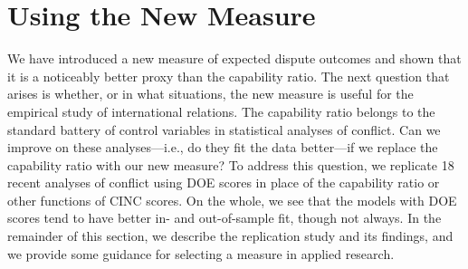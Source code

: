 \section{Using the New Measure}

We have introduced a new measure of expected dispute outcomes and shown that it is a noticeably better proxy than the capability ratio.
The next question that arises is whether, or in what situations, the new measure is useful for the empirical study of international relations.
The capability ratio belongs to the standard battery of control variables in statistical analyses of conflict.
Can we improve on these analyses---i.e., do they fit the data better---if we replace the capability ratio with our new measure?
To address this question, we replicate 18 recent analyses of conflict using DOE scores in place of the capability ratio or other functions of CINC scores.
On the whole, we see that the models with DOE scores tend to have better in- and out-of-sample fit, though not always.
In the remainder of this section, we describe the replication study and its findings, and we provide some guidance for selecting a measure in applied research.


